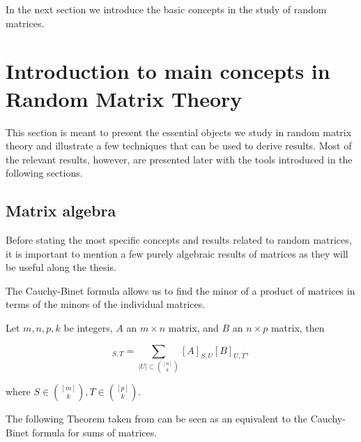 In the next section we introduce the basic concepts in the study of random matrices.

\section{Introduction to main concepts in Random Matrix Theory}

This section is meant to present the essential objects we study in random matrix theory and illustrate a few techniques that can be used to derive results. Most of the relevant results, however, are presented later with the tools introduced in the following sections.



\subsection{Matrix algebra}

Before stating the most specific concepts and results related to random matrices, it is important to mention a few purely algebraic results of matrices as they will be useful along the thesis.

The Cauchy-Binet formula allows us to find the minor of a product of matrices in terms of the minors of the individual matrices.

\begin{theorem} 
    Let $m,n,p,k$ be integers, $A$ an $m\times n$ matrix, and $B$ an $n\times p$ matrix, then

    \begin{equation*}
        [AB]_{S,T} = \sum_{|U|\subset \binom{[n]}{k}} [A]_{S,U} [B]_{U,T},
    \end{equation*}

    \noindent where $S\in \binom{[m]}{k}, T \in \binom{[p]}{k}$.
\end{theorem}

The following Theorem taken from \cite{article:finitefree} can be seen as an equivalent to the Cauchy-Binet formula for sums of matrices.

